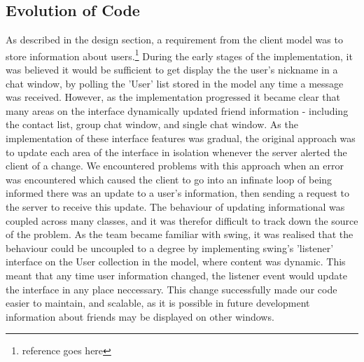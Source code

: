 \subsection{Evolution of Code}

As described in the design section, a requirement from the client model was to store information about users.\footnote{reference goes here} During the early stages of the implementation, it was believed it would be sufficient to get display the the user's nickname in a chat window, by polling the 'User' list stored in the model any time a message was received. However, as the implementation progressed it became clear that many areas on the interface dynamically updated friend information - including the contact list, group chat window, and single chat window. As the implementation of these interface features was gradual, the original approach was to update each area of the interface in isolation whenever the server alerted the client of a change. We encountered problems with this approach when an error was encountered which caused the client to go into an infinate loop of being informed there was an update to a user's information, then sending a request to the server to receive this update. The behaviour of updating informational was coupled across many classes, and it was therefor difficult to track down the source of the problem. As the team became familiar with swing, it was realised that the behaviour could be uncoupled to a degree by implementing swing's 'listener' interface on the User collection in the model, where content was dynamic. This meant that any time user information changed, the listener event would update the interface in any place neccessary. This change successfully made our code easier to maintain, and scalable, as it is possible in future development information about friends may be displayed on other windows. 